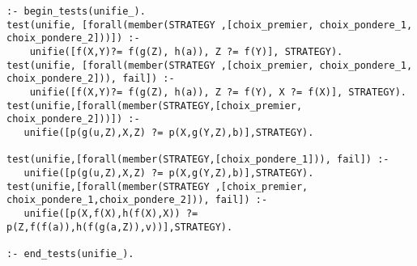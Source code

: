 \documentclass[10pt,a4paper]{report}
\begin{document}
\begin{lstlisting}[caption ={le fichier test.pl}]
:- begin_tests(unifie_).
test(unifie, [forall(member(STRATEGY ,[choix_premier, choix_pondere_1, choix_pondere_2]))]) :- 
    unifie([f(X,Y)?= f(g(Z), h(a)), Z ?= f(Y)], STRATEGY).
test(unifie, [forall(member(STRATEGY ,[choix_premier, choix_pondere_1, choix_pondere_2])), fail]) :- 
    unifie([f(X,Y)?= f(g(Z), h(a)), Z ?= f(Y), X ?= f(X)], STRATEGY).
test(unifie,[forall(member(STRATEGY,[choix_premier, choix_pondere_2]))]) :- 
   unifie([p(g(u,Z),X,Z) ?= p(X,g(Y,Z),b)],STRATEGY).

test(unifie,[forall(member(STRATEGY,[choix_pondere_1])), fail]) :- 
   unifie([p(g(u,Z),X,Z) ?= p(X,g(Y,Z),b)],STRATEGY).
test(unifie,[forall(member(STRATEGY ,[choix_premier, choix_pondere_1,choix_pondere_2])), fail]) :-
   unifie([p(X,f(X),h(f(X),X)) ?= p(Z,f(f(a)),h(f(g(a,Z)),v))],STRATEGY).

:- end_tests(unifie_).
\end{lstlisting}
\end{document}
